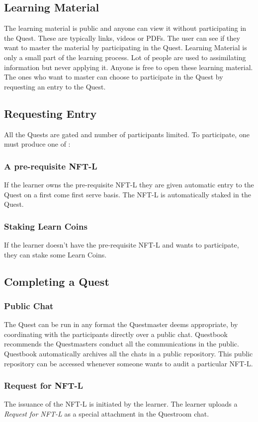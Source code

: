 \documentclass{article}
\begin{document}
    \subsection{Learning Material}
        The learning material is public and anyone can view it without participating in the Quest. 
        These are typically links, videos or PDFs. The user can see if they want to master the material by participating in the Quest. 
        Learning Material is only a small part of the learning process. Lot of people are used to assimilating information but never applying it. 
        Anyone is free to open these learning material. The ones who want to master can choose to participate in the Quest by requesting an entry to the Quest.
    \subsection{Requesting Entry}
        All the Quests are gated and number of participants limited. To participate, one must produce one of :
        \subsubsection{A pre-requisite NFT-L}
          If the learner owns the pre-requisite NFT-L they are given automatic entry to the Quest on a first come first serve basis. The NFT-L is automatically staked in the Quest.
        \subsubsection{Staking Learn Coins}
          If the learner doesn't have the pre-requisite NFT-L and wants to participate, they can stake some Learn Coins.
    \subsection{Completing a Quest}
        \subsubsection{Public Chat}
          The Quest can be run in any format the Questmaster deems appropriate, by coordinating with the participants directly over a public chat. 
          Questbook recommends the Questmasters conduct all the communications in the public. Questbook automatically archives all the chats in a public repository.
          This public repository can be accessed whenever someone wants to audit a particular NFT-L.
        \subsubsection{Request for NFT-L}
          The issuance of the NFT-L is initiated by the learner. The learner uploads a \textit{Request for NFT-L} as a special attachment in the Questroom chat.
\end{document}
